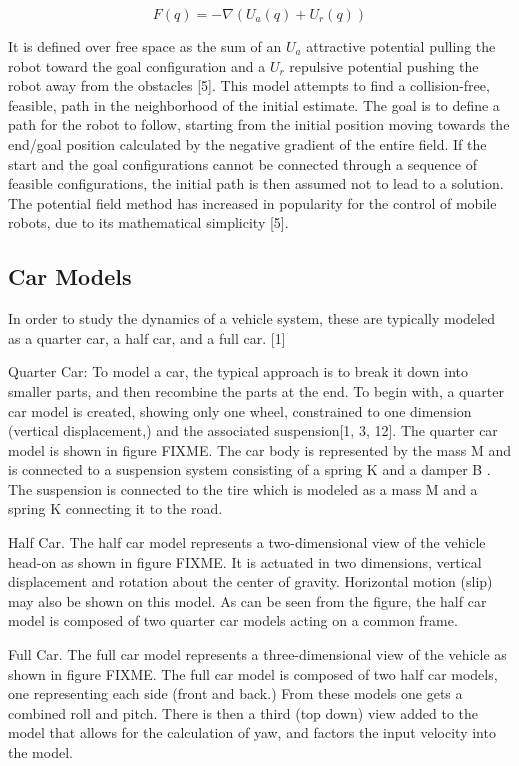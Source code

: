 $$F(q)=-\nabla(U_a(q)+U_r(q))$$

It is defined over free space as the sum of an $U_a$ attractive potential pulling the robot toward the goal configuration and a $U_r$ repulsive potential pushing the robot away from the obstacles [5]. This model attempts to find a collision-free, feasible, path in the neighborhood of the initial estimate. The goal is to define a path for the robot to follow, starting from the initial position moving towards the end/goal position calculated by the negative gradient of the entire field. If the start and the goal configurations cannot be connected through a sequence of feasible configurations, the initial path is then assumed not to lead to a solution. The potential field method has increased in popularity for the control of mobile robots, due to its mathematical simplicity [5].

\subsection{Car Models}
In order to study the dynamics of a vehicle system, these are typically modeled as a quarter car, a half car, and a full car. [1]

Quarter Car: To model a car, the typical approach is to break it down into smaller parts, and then recombine the parts at the end. To begin with, a quarter car model is created, showing only one wheel, constrained to one dimension (vertical displacement,) and the associated suspension[1, 3, 12]. The quarter car model is shown in figure FIXME. The car body is represented by the mass M and is connected to a suspension system consisting of a spring K and a damper B . The suspension is connected to the tire which is modeled as a mass M and a spring K connecting it to the road.


Half Car. The half car model represents a two-dimensional view of the vehicle head-on as shown in figure FIXME. It is actuated in two dimensions, vertical displacement and rotation about the center of gravity. Horizontal motion (slip) may also be shown on this model. As can be seen from the figure, the half car model is composed of two quarter car models acting on a common frame.


Full Car. The full car model represents a three-dimensional view of the vehicle as shown in figure FIXME. The full car model is composed of two half car models, one representing each side (front and back.) From these models one gets a combined roll and pitch. There is then a third (top down) view added to the model that allows for the calculation of yaw, and factors the input velocity into the model.


